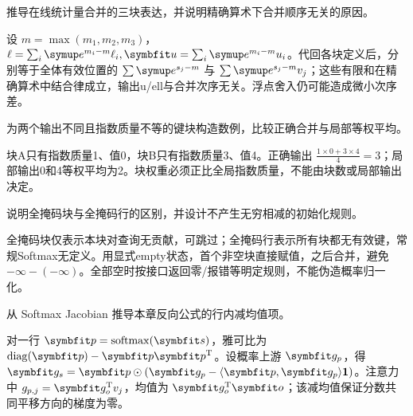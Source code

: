 
\begin{exercises}
\begin{exercise} 推导在线统计量合并的三块表达，并说明精确算术下合并顺序无关的原因。

\begin{solution}
设 $m=\max(m_1,m_2,m_3)$，$\ell=\sum_i\conste{}^{m_i-m}\ell_i,\vect{u}=\sum_i\conste{}^{m_i-m}u_i$。代回各块定义后，分别等于全体有效位置的 $\sum \conste{}^{s_j-m}$ 与 $\sum \conste{}^{s_j-m}v_j$；这些有限和在精确算术中结合律成立，输出u/ell与合并次序无关。浮点舍入仍可能造成微小次序差。
\end{solution}
\end{exercise}

\begin{exercise} 为两个输出不同且指数质量不等的键块构造数例，比较正确合并与局部等权平均。

\begin{solution}
块A只有指数质量1、值0，块B只有指数质量3、值4。正确输出 $\frac{1\times0+3\times4}{4}=3$；局部输出0和4等权平均为2。块权重必须正比全局指数质量，不能由块数或局部输出决定。
\end{solution}
\end{exercise}

\begin{exercise} 说明全掩码块与全掩码行的区别，并设计不产生无穷相减的初始化规则。

\begin{solution}
全掩码块仅表示本块对查询无贡献，可跳过；全掩码行表示所有块都无有效键，常规Softmax无定义。用显式empty状态，首个非空块直接赋值，之后合并，避免 $-\infty-(-\infty)$。全部空时按接口返回零/报错等明定规则，不能伪造概率归一化。
\end{solution}
\end{exercise}

\begin{exercise}\optional 从 Softmax Jacobian 推导本章反向公式的行内减均值项。

\begin{solution}
对一行 $\vect{p}=\mathrm{softmax}(\vect{s})$，雅可比为 $\mathrm{diag}(\vect{p})-\vect{p}\vect{p}^{\mathrm{T}}$。设概率上游 $\vect{g}_p$，得 $\vect{g}_s=\vect{p}\odot(\vect{g}_p-\langle \vect{p},\vect{g}_p\rangle\mathbf1)$。注意力中 $g_{p,j}=\vect{g}_o^{\mathrm{T}}v_j$，均值为 $\vect{g}_o^{\mathrm{T}}\vect{o}$；该减均值保证分数共同平移方向的梯度为零。
\end{solution}
\end{exercise}


\end{exercises}
